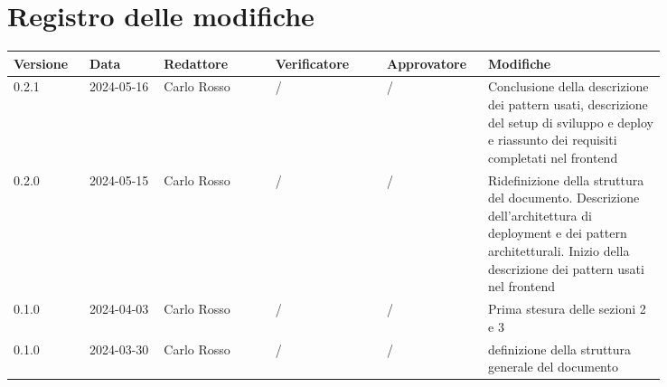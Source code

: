 \section*{Registro delle modifiche}
 {
  \renewcommand{\arraystretch}{1.5}
  \scriptsize
  \begin{longtable}{p{0.10\linewidth}p{0.10\linewidth}p{0.15\linewidth}p{0.15\linewidth}p{0.10\linewidth}p{0.24\linewidth}}
	  \textbf{Versione} & \textbf{Data} & \textbf{Redattore} & \textbf{Verificatore} & \textbf{Approvatore} & \textbf{Modifiche}                                 \\
	  \toprule
	  0.2.1             & 2024-05-16    & Carlo Rosso        & /
	  & /                    & Conclusione della descrizione dei pattern usati,
	  descrizione del setup di sviluppo e deploy e riassunto dei requisiti
	  completati
	  nel frontend \\
	  \hline
	  0.2.0             & 2024-05-15    & Carlo Rosso        & /
	  & /                    & Ridefinizione della struttura del documento.
	  Descrizione dell'architettura di deployment e dei pattern architetturali.
	  Inizio della descrizione dei pattern usati nel frontend \\
	  \hline
	  0.1.0             & 2024-04-03    & Carlo Rosso        & /                     & /                    & Prima stesura delle sezioni 2 e 3                  \\
	  \hline
	  0.1.0             & 2024-03-30    & Carlo Rosso        & /                     & /                    & definizione della struttura generale del documento \\
	  \bottomrule
  \end{longtable}
 }
